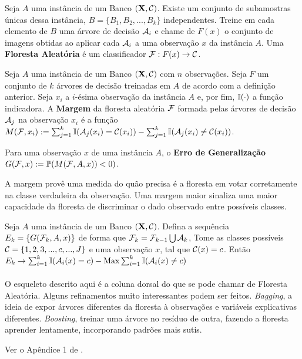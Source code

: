 \begin{defi}
 Seja $A$ uma instância de um Banco $(\mathbf{X}, \mathcal{C})$. Existe um conjunto de subamostras únicas dessa instância, $B = \{ B_1, B_2, ..., B_k\}$  independentes. Treine em cada elemento de $B$ uma árvore de decisão $\mathcal{A}_i$ e chame de $F(x)$ o conjunto de imagens obtidas ao aplicar cada $\mathcal{A}_i$ a uma observação $x$ da instância $A$. Uma \textbf{Floresta Aleatória} é um classificador $\mathcal{F} : F(x) \to \mathcal{C}$. 
  \end{defi}
  
  \begin{defi}
  Seja $A$ uma instância de um Banco $(\mathbf{X}, \mathcal{C})$ com $n$ observações. Seja $F$ um conjunto de $k$ árvores de decisão treinadas em $A$ de acordo com a definição anterior. Seja $x_i$ a $i$-ésima observação da instância $A$ e, por fim, $\mathbb{I}(\cdot)$ a função indicadora. A \textbf{Margem} da floresta aleatória $\mathcal{F}$ formada pelas árvores de decisão $\mathcal{A}_j$ na observação $x_i$ é a função $M(\mathcal{F}, x_i) := \sum_{j=1}^k \mathbb{I} ( \mathcal{A}_j (x_i) = \mathcal{C}(x_i) ) - \sum_{j=1}^k \mathbb{I}  ( \mathcal{A}_j (x_i) \neq \mathcal{C}(x_i) )$.
  
  \end{defi}
  
  
  \begin{defi}
 Para uma observação $x$ de uma instância $A$, o \textbf{Erro de Generalização} $G(\mathcal{F}, x) := \mathbb{P} (M(\mathcal{F}, A, x)) < 0)$.  \end{defi}
  
  A margem provê uma medida do quão precisa é a floresta em votar corretamente na classe verdadeira da observação. Uma margem maior sinaliza uma maior capacidade da floresta de discriminar o dado observado entre possíveis classes.  

 \begin{teo} Seja $A$ uma instância de um Banco $(\mathbf{X}, \mathcal{C})$. Defina a sequência $E_k = \{ G(\mathcal{F}_k, A, x) \}$ de forma que $\mathcal{F}_k = \mathcal{F}_{k-1} \bigcup \mathcal{A}_k $,  Tome as classes possíveis $\mathcal{C} = \{1,2,3,...,c,...,J \}$ e uma observação $x$, tal que $\mathcal{C}(x) = c$. Então $E_k \to \sum_{i=1}^k \mathbb{I} ( \mathcal{A}_i (x) = c ) - \underset{}{\text{Max}} \sum_{i=1}^k \mathbb{I}  ( \mathcal{A}_i (x) \neq c) $
 
 \end{teo}
 
 O esqueleto descrito aqui é a coluna dorsal do que se pode chamar de Floresta Aleatória. Alguns refinamentos muito interessantes podem ser feitos. \textit{Bagging}, a ideia de expor árvores diferentes da floresta à observações e variáveis explicativas diferentes. \textit{Boosting}, treinar uma árvore no resíduo de outra, fazendo a floresta aprender lentamente, incorporando padrões mais sutis. 
 
 
 
 \begin{prova}
 Ver o Apêndice 1 de . \blacksquare
 \end{prova}
